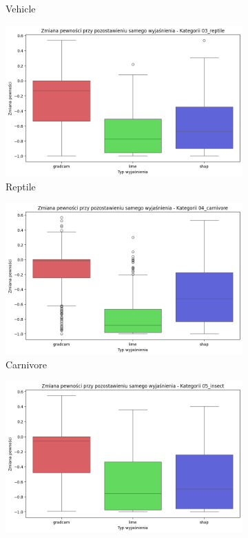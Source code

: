\begin{figure}
\begin{subfigure}[b]{0.3\textwidth}
		\caption{Vehicle}  \label{rys:base_confidence_exp_vehicle}
	\end{subfigure}
	\begin{subfigure}[b]{0.3\textwidth}
		\centering\includegraphics[width=.9\textwidth]{img/base_confidence_exp_reptile}
		\caption{Reptile}  \label{rys:base_confidence_exp_reptile}
	\end{subfigure}
	\begin{subfigure}[b]{0.3\textwidth}
		\centering\includegraphics[width=.9\textwidth]{img/base_confidence_exp_carnivore}
		\caption{Carnivore}  \label{rys:base_confidence_exp_carnivore}
	\end{subfigure}
	\begin{subfigure}[b]{0.3\textwidth}
		\centering\includegraphics[width=.9\textwidth]{img/base_confidence_exp_insect}

\end{subfigure}
\end{figure}
